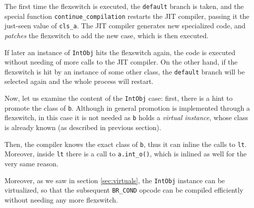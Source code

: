 The first time the flexswitch is executed, the \lstinline{default} branch is
taken, and the special function \lstinline{continue_compilation} restarts the
JIT compiler, passing it the just-seen value of \lstinline{cls_a}.  The JIT
compiler generates new specialized code, and \emph{patches} the flexswitch to
add the new case, which is then executed.

If later an instance of \lstinline{IntObj} hits the flexswitch again, the
code is executed without needing of more calls to the JIT compiler.  On the
other hand, if the flexswitch is hit by an instance of some other class, the
\lstinline{default} branch will be selected again and the whole process will
restart.

Now, let us examine the content of the \lstinline{IntObj} case: first, there
is a hint to promote the class of \lstinline{b}.  Although in general
promotion is implemented through a flexswitch, in this case it is not needed
as \lstinline{b} holds a \emph{virtual instance}, whose class is already
known (as described in previous section).

Then, the compiler knows the exact class of \lstinline{b}, thus it can inline
the calls to \lstinline{lt}.  Moreover, inside \lstinline{lt} there is a
call to \lstinline{a.int_o()}, which is inlined as well for the very same
reason.

Moreover, as we saw in section \ref{sec:virtuals}, the \lstinline{IntObj}
instance can be virtualized, so that the subsequent \lstinline{BR_COND} opcode
can be compiled efficiently without needing any more flexswitch.
